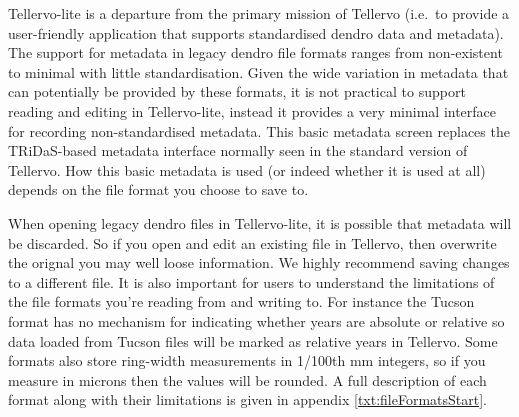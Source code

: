 Tellervo-lite is a departure from the primary mission of Tellervo (i.e.\ to provide a user-friendly application that supports standardised dendro data and metadata). The support for metadata in legacy dendro file formats ranges from non-existent to minimal with little standardisation.  Given the wide variation in metadata that can potentially be provided by these formats, it is not practical to support reading and editing in Tellervo-lite, instead it provides a very minimal interface for recording non-standardised metadata.  This basic metadata screen replaces the TRiDaS-based metadata interface normally seen in the standard version of Tellervo.  How this basic metadata is used (or indeed whether it is used at all) depends on the file format you choose to save to.  

When opening legacy dendro files in Tellervo-lite, it is possible that metadata will be discarded.  So if you open and edit an existing file in Tellervo, then overwrite the orignal you may well loose information.  We highly recommend saving changes to a different file.  It is also important for users to understand the limitations of the file formats you're reading from and writing to.  For instance the Tucson format has no mechanism for indicating whether years are absolute or relative so data loaded from Tucson files will be marked as relative years in Tellervo.  Some formats also store ring-width measurements in 1/100th mm integers, so if you measure in microns then the values will be rounded. A full description of each format along with their limitations is given in appendix \ref{txt:fileFormatsStart}.






